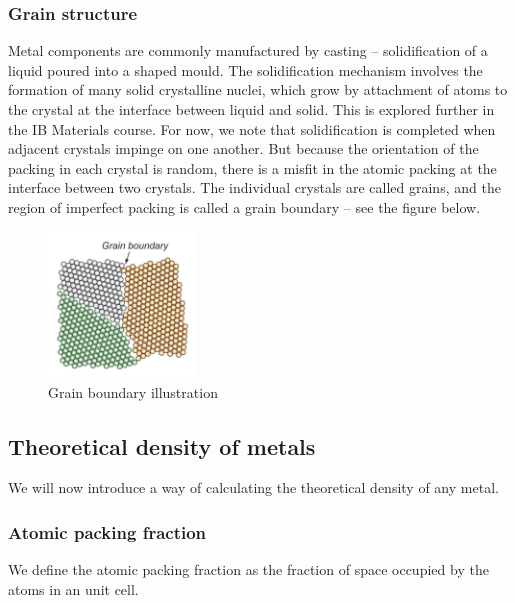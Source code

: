 \documentclass{article}
\begin{document}
\subsubsection{Grain structure}

Metal components are commonly manufactured by casting – solidification of a liquid poured into a shaped mould. The solidification mechanism involves the formation of many solid crystalline nuclei, which grow by attachment of atoms to the crystal at the interface between liquid and solid. This is explored further in the IB Materials course. For now, we note that solidification is completed when adjacent crystals impinge on one another. But because the orientation of the packing in each crystal is random, there is a misfit in the atomic packing at the interface between two crystals. The individual crystals are called grains, and the region of imperfect packing is called a grain boundary – see the figure below.

\begin{figure}[h]
    \centering
    \includegraphics[width = 0.35\textwidth]{images/mat7.png}
    \caption{Grain boundary illustration}
    \label{fig:enter-label}
\end{figure}

\newpage

\subsection{Theoretical density of metals}

We will now introduce a way of calculating the theoretical density of any metal.

\subsubsection{Atomic packing fraction}

\begin{definition}
    We define the atomic packing fraction as the fraction of space occupied by the atoms in an unit cell.
\end{definition}
\end{document}
